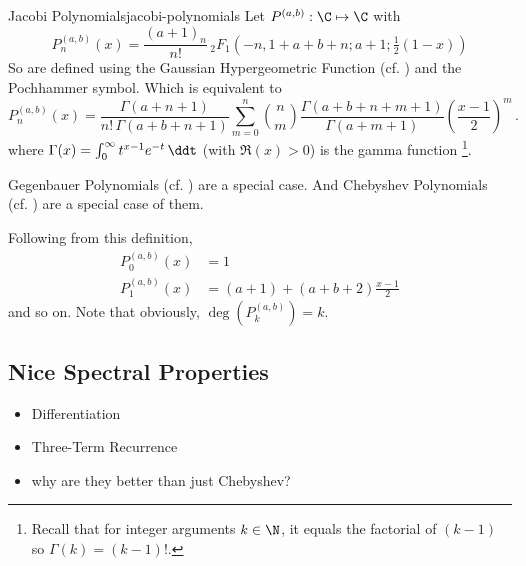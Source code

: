 \begin{definition}{Jacobi Polynomials}{jacobi-polynomials}
  Let $P^{(a, b)}: \C \mapsto \C$ with
  \[P^{(a,b)}_n(x) = {\frac{(a +1)_{n}}{n!}}\,{}_{2}F_{1}\left(-n,1+a +b +n;a +1;{\tfrac  {1}{2}}(1-x)\right)\]
  So are defined using the Gaussian Hypergeometric Function (cf. ) and the Pochhammer symbol.
  Which is equivalent to
  $$P_{n}^{{(a, b)}}(x)={\frac  {\Gamma (a +n+1)}{n!\,\Gamma (a +b +n+1)}}\sum _{{m=0}}^{n}\binom{n}{m}{\frac{\Gamma (a +b +n+m+1)}{\Gamma (a +m+1)}}\left({\frac{x-1}{2}}\right)^{m}\,.$$
  where $\Gamma (x)=\int _{0}^{\infty }t^{x-1}e^{-t}\,\ddt$ (with $\Re(x)>0$) is the gamma function \footnote{Recall that for integer arguments $k \in \N$, it equals the factorial of $(k-1)$ so $\Gamma(k) = (k-1)!$.}.

  Gegenbauer Polynomials (cf. ) are a special case. And
  Chebyshev Polynomials (cf. ) are a special case of them.
\end{definition}

Following from this definition,
\begin{align*}
  P_0^{(a, b)}(x)   & = 1                            \\
  P_{1}^{(a, b)}(x) & = (a+1)+(a+b+2){\frac{x-1}{2}}
\end{align*}
and so on. Note that obviously, $\deg\left(P_k^{(a, b)}\right) = k$.

\hypertarget{nice-spectral-properties}{%
  \subsection{Nice Spectral Properties}\label{nice-spectral-properties}}

\begin{itemize}
  \item Differentiation
  \item Three-Term Recurrence
  \item why are they better than just Chebyshev?
\end{itemize}
